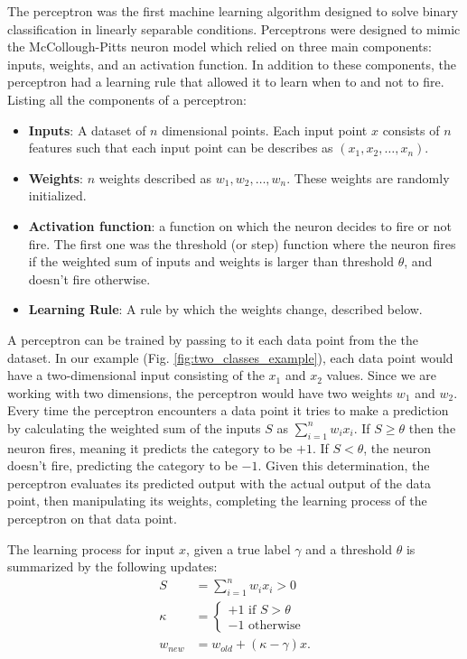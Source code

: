  The perceptron was the first machine learning algorithm designed to solve binary classification in linearly separable conditions. Perceptrons were designed to mimic the McCollough-Pitts neuron model which relied on three main components: inputs, weights, and an activation function. In addition to these components, the perceptron had a learning rule that allowed it to learn when to and not to fire. Listing all the components of a perceptron:
\begin{itemize}
  \item \textbf{Inputs}: A dataset of $n$ dimensional points. Each input point $x$ consists of $n$ features such that each input point can be describes as $(x_1, x_2, \dots, x_n)$.
  \item \textbf{Weights}: $n$ weights described as $w_1, w_2, \dots, w_n$. These weights are randomly initialized.
  \item \textbf{Activation function}: a function on which the neuron decides to fire or not fire. The first one was the threshold (or step) function where the neuron fires if the weighted sum of inputs and weights is larger than threshold $\theta$, and doesn't fire otherwise.
  \item \textbf{Learning Rule}: A rule by which the weights change, described below.
\end{itemize}


A perceptron can be trained by passing to it each data point from the the dataset. In our example (Fig. \ref{fig:two_classes_example}), each data point would have a two-dimensional input consisting of the $x_1$ and $x_2$ values. Since we are working with two dimensions, the perceptron would have two weights $w_1$ and $w_2$. Every time the perceptron encounters a data point it tries to make a prediction by calculating the weighted sum of the inputs $S$  as $\sum_{i=1}^n w_ix_i$. If $S \geq \theta$ then the neuron fires, meaning it predicts the category to be $+1$. If $S < \theta$, the neuron doesn't fire, predicting the category to be $-1$. Given this determination, the perceptron evaluates its predicted output with the actual output of the data point, then manipulating its weights, completing the learning process of the perceptron on that data point. 

The learning process for input $x$, given a true label $\gamma$ and a threshold $\theta$ is summarized by the following updates:
\begin{align}
  S &= \sum_{i=1}^n w_ix_i > 0  \\
  \kappa &= \begin{cases} 
  \label{eq:piecewise_threshold_function}
    +1 \textrm{ if $S$} > \theta \\
    -1 \textrm{ otherwise} 
  \end{cases} \\
  w_{new} &= w_{old} + (\kappa - \gamma)x.
\end{align}

